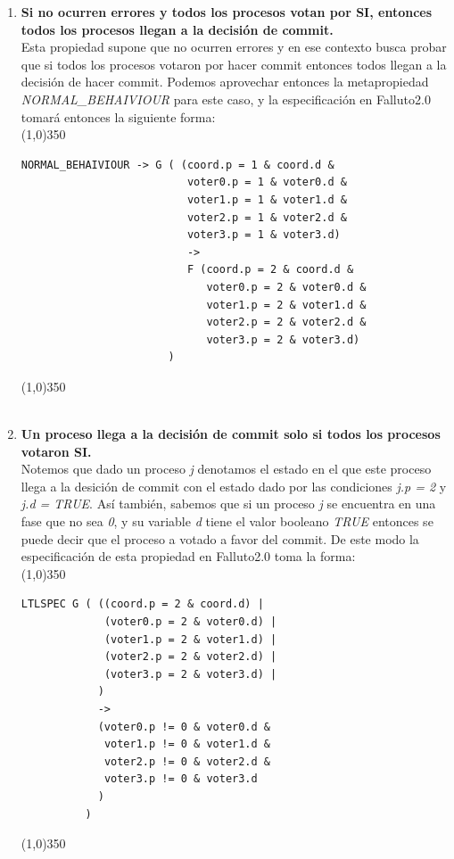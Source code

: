 \documentclass[titlepage, 12pt]{book}
\begin{document}
\begin{enumerate}
\item \textbf{Si no ocurren errores y todos los procesos votan por \textbf{SI}, entonces todos los procesos llegan a la decisi\'on de commit.}\\ Esta propiedad supone que no ocurren errores y en ese contexto busca probar que si todos los procesos votaron por hacer commit entonces todos llegan a la decisi\'on de hacer commit. Podemos aprovechar entonces la metapropiedad \textit{NORMAL\_BEHAIVIOUR} para este caso, y la especificaci\'on en Falluto2.0 tomar\'a entonces la siguiente forma:\\
\noindent \line(1,0){350}
\begin{verbatim}
NORMAL_BEHAIVIOUR -> G ( (coord.p = 1 & coord.d & 
                          voter0.p = 1 & voter0.d & 
                          voter1.p = 1 & voter1.d & 
                          voter2.p = 1 & voter2.d & 
                          voter3.p = 1 & voter3.d) 
                          -> 
                          F (coord.p = 2 & coord.d & 
                             voter0.p = 2 & voter0.d & 
                             voter1.p = 2 & voter1.d & 
                             voter2.p = 2 & voter2.d & 
                             voter3.p = 2 & voter3.d)
                       )
\end{verbatim}
\noindent \line(1,0){350}
~\\\\

\item \textbf{Un proceso llega a la decisi\'on de commit solo si todos los procesos votaron \textbf{SI}.}\\ Notemos que dado un proceso \textit{j} denotamos el estado en el que este proceso llega a la desici\'on de commit con el estado dado por las condiciones \textit{j.p = 2} y \textit{j.d = TRUE}. As\'i tambi\'en, sabemos que si un proceso \textit{j} se encuentra en una fase que no sea \textit{0}, y su variable \textit{d} tiene el valor booleano \textit{TRUE} entonces se puede decir que el proceso a votado a favor del commit. De este modo la especificaci\'on de esta propiedad en Falluto2.0 toma la forma:\\
\noindent \line(1,0){350}
\begin{verbatim}
LTLSPEC G ( ((coord.p = 2 & coord.d) |
             (voter0.p = 2 & voter0.d) |            
             (voter1.p = 2 & voter1.d) |
             (voter2.p = 2 & voter2.d) |
             (voter3.p = 2 & voter3.d) |
            )
            -> 
            (voter0.p != 0 & voter0.d & 
             voter1.p != 0 & voter1.d & 
             voter2.p != 0 & voter2.d & 
             voter3.p != 0 & voter3.d
            )
          ) 
\end{verbatim}
\noindent \line(1,0){350}
~\\\\


\end{enumerate}
\end{document}
